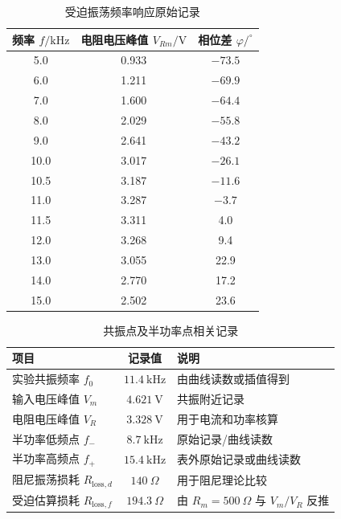 ﻿\documentclass[UTF8,12pt,a4paper]{ctexart}
\numberwithin{equation}{section}
\begin{document}
\begin{table}[H]
\centering
\caption{受迫振荡频率响应原始记录}
\begin{tabular}{ccc}
\toprule
频率 \(f/\mathrm{kHz}\) & 电阻电压峰值 \(V_{Rm}/\mathrm{V}\) & 相位差 \(\varphi/^\circ\) \\
\midrule
5.0 & 0.933 & \(-73.5\) \\
6.0 & 1.211 & \(-69.9\) \\
7.0 & 1.600 & \(-64.4\) \\
8.0 & 2.029 & \(-55.8\) \\
9.0 & 2.641 & \(-43.2\) \\
10.0 & 3.017 & \(-26.1\) \\
10.5 & 3.187 & \(-11.6\) \\
11.0 & 3.287 & \(-3.7\) \\
11.5 & 3.311 & 4.0 \\
12.0 & 3.268 & 9.4 \\
13.0 & 3.055 & 22.9 \\
14.0 & 2.770 & 17.2 \\
15.0 & 2.502 & 23.6 \\
\bottomrule
\end{tabular}
\end{table}

\begin{table}[H]
\centering
\caption{共振点及半功率点相关记录}
\begin{tabularx}{\textwidth}{>{\centering\arraybackslash}p{4cm} C Y}
\toprule
项目 & 记录值 & 说明 \\
\midrule
实验共振频率 \(f_0\) & \(11.4\ \mathrm{kHz}\) & 由曲线读数或插值得到 \\
输入电压峰值 \(V_m\) & \(4.621\ \mathrm{V}\) & 共振附近记录 \\
电阻电压峰值 \(V_R\) & \(3.328\ \mathrm{V}\) & 用于电流和功率核算 \\
半功率低频点 \(f_-\) & \(8.7\ \mathrm{kHz}\) & 原始记录/曲线读数 \\
半功率高频点 \(f_+\) & \(15.4\ \mathrm{kHz}\) & 表外原始记录或曲线读数 \\
阻尼振荡损耗 \(R_{\mathrm{loss},d}\) & \(140\ \Omega\) & 用于阻尼理论比较 \\
受迫估算损耗 \(R_{\mathrm{loss},f}\) & \(194.3\ \Omega\) & 由 \(R_m=500\ \Omega\) 与 \(V_m/V_R\) 反推 \\
\bottomrule
\end{tabularx}
\end{table}
\end{document}

